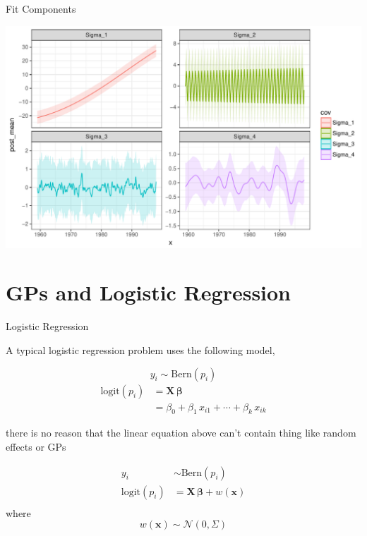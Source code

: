 \documentclass[11pt,ignorenonframetext,]{beamer}
\begin{document}
\begin{frame}{Fit Components}

\includegraphics{Lec15_files/figure-beamer/unnamed-chunk-22-1.pdf}

\end{frame}

\section{GPs and Logistic Regression}\label{gps-and-logistic-regression}

\begin{frame}[t]{Logistic Regression}

A typical logistic regression problem uses the following model,

\[y_i \sim \text{Bern}(p_i)\] \[\begin{aligned}
\text{logit}(p_i) 
  &= \bm{X}\,\bm{\beta} \\
  &= \beta_0 + \beta_1 \, x_{i1} + \cdots + \beta_k \, x_{ik}
\end{aligned}\]

\pause

there is no reason that the linear equation above can't contain thing
like random effects or GPs

\[\begin{aligned}
y_i &\sim \text{Bern}(p_i) \\
\text{logit}(p_i) 
  &= \bm{X}\,\bm{\beta} + w(\bm{x}) \\
\end{aligned}\] where \[ w(\bm{x}) \sim \mathcal{N}(0,\Sigma)\]

\end{frame}
\end{document}
